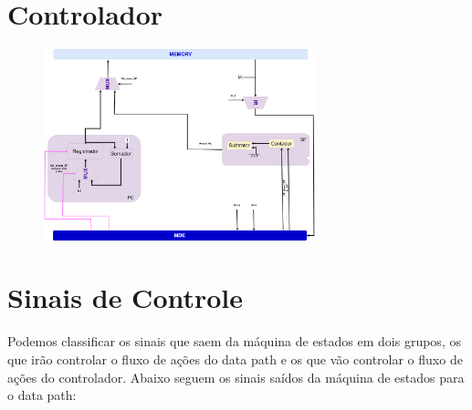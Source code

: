\documentclass[12pt]{article}
\begin{document}
\section{Controlador}

\begin{figure}[!htb]
\centering
\includegraphics[width=0.7\textwidth]{controller.png}
\end{figure}


\section{Sinais de Controle}
Podemos classificar os sinais que saem da máquina de estados em dois grupos, os que irão controlar o fluxo de ações do data path e os que vão controlar o fluxo de ações do controlador. Abaixo seguem os sinais saídos da máquina de estados para o data path:
\end{document}
